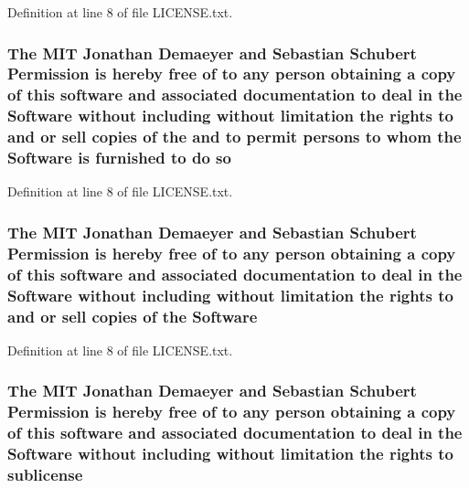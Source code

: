 Definition at line 8 of file L\+I\+C\+E\+N\+S\+E.\+txt.

\subsubsection[{\texorpdfstring{so}{so}}]{\setlength{\rightskip}{0pt plus 5cm}The M\+IT Jonathan Demaeyer and Sebastian Schubert Permission is hereby free of to any person obtaining a {\bf copy} of this software and associated documentation to deal in the {\bf Software} without including without limitation the rights to and or sell copies of the and to permit persons to whom the {\bf Software} is furnished to do so}\hypertarget{LICENSE_8txt_a24a909263a383e389f43dbaea954a90b}{}\label{LICENSE_8txt_a24a909263a383e389f43dbaea954a90b}


Definition at line 8 of file L\+I\+C\+E\+N\+S\+E.\+txt.

\subsubsection[{\texorpdfstring{Software}{Software}}]{\setlength{\rightskip}{0pt plus 5cm}The M\+IT Jonathan Demaeyer and Sebastian Schubert Permission is hereby free of to any person obtaining a {\bf copy} of this software and associated documentation to deal in the Software without including without limitation the rights to and or sell copies of the Software}\hypertarget{LICENSE_8txt_a5972617605af8d0ee35a18608e832e08}{}\label{LICENSE_8txt_a5972617605af8d0ee35a18608e832e08}


Definition at line 8 of file L\+I\+C\+E\+N\+S\+E.\+txt.

\subsubsection[{\texorpdfstring{sublicense}{sublicense}}]{\setlength{\rightskip}{0pt plus 5cm}The M\+IT Jonathan Demaeyer and Sebastian Schubert Permission is hereby free of to any person obtaining a {\bf copy} of this software and associated documentation to deal in the {\bf Software} without including without limitation the rights to sublicense}\hypertarget{LICENSE_8txt_a2d02ad98d8bbfd91a923533c6d2e3bec}{}\label{LICENSE_8txt_a2d02ad98d8bbfd91a923533c6d2e3bec}


